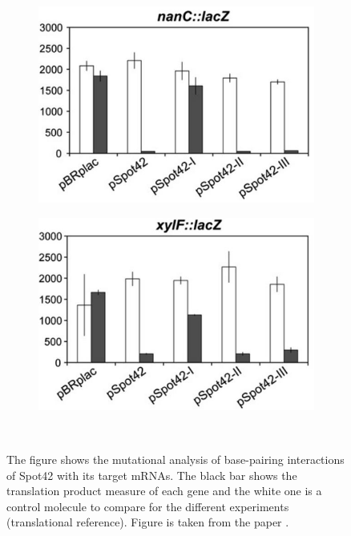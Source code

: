 \documentclass[twoside,a4paper]{report}
\numberwithin{equation}{section}
\begin{document}
\begin{figure}[h!tb]
\begin{subfigure}{.5\textwidth}
		\label{fig:srlA}
	\end{subfigure}
	\begin{subfigure}{.5\textwidth}
		\centering
		\includegraphics[width=.7\linewidth]{nanC}
		\label{fig:nanC}
	\end{subfigure}%
	\begin{subfigure}{.5\textwidth}
		\centering
		\includegraphics[width=.7\linewidth]{xylF}
	
		\label{fig:xylF}
	\end{subfigure}
	\
	\caption{The figure shows the mutational analysis of base-pairing interactions of Spot42 with its target mRNAs. The black bar shows the translation product measure of each gene and the white one is a control molecule to compare for the different experiments (translational reference). Figure is taken from the paper \citep{beisel2011base} .\\ }
	\label{fig:all}
\end{figure}
\end{document}
